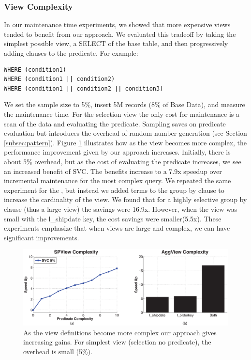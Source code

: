 \subsubsection{View Complexity}
In our maintenance time experiments, we showed that more expensive views tended to benefit from our approach.
We evaluated this tradeoff by taking the simplest possible view, a SELECT of the base table, and then progressively adding clauses to the predicate.
For example:
\begin{lstlisting}
WHERE (condition1)
WHERE (condition1 || condition2)
WHERE (condition1 || condition2 || condition3)
\end{lstlisting}
We set the sample size to 5\%, insert 5M records (8\% of Base Data), and measure the maintenance time.
For the selection view the only cost for maintenance is a scan of the data and evaluating the predicate. 
Sampling saves on predicate evaluation but introduces the overhead of random number generation (see Section \ref{subsec:pattern}). 
Figure \ref{exp11overheads} illustrates how as the view becomes more complex, the performance improvement given
by our approach increases.
Initially, there is about 5\% overhead, but as the cost of evaluating the predicate increases, we see an increased benefit of SVC.
The benefits increase to a 7.9x speedup over incremental maintenance for the most complex query.
We repeated the same experiment for the \aggview, but instead we added terms to the group by clause to increase the
cardinality of the view.
We found that for a highly selective group by clause (thus a large view) the savings were 16.9x.
However, when the view was small with the l\_shipdate key, the cost savings were smaller(5.5x).
These experiments emphasize that when views are large and complex, we can have significant improvements.
\begin{figure}[!t]\vspace{-1em}
 \includegraphics[trim = 35mm 0mm 35mm 0mm, clip,width=\columnwidth]{exp/complexity_efficiency_tradeoff.eps}\vspace{-1em}
 \caption{As the view definitions become more complex our approach gives increasing gains. For simplest view (selection no predicate), the overhead is small (5\%).\label{exp11overheads}}\vspace{-1em}
\end{figure}



